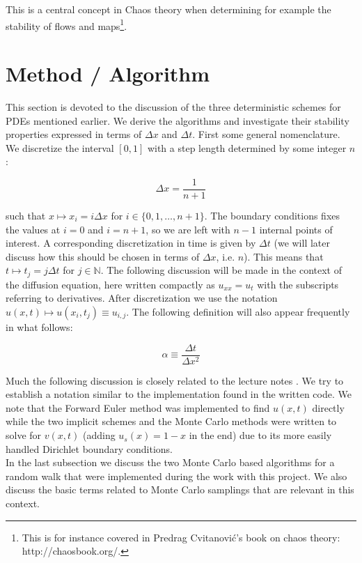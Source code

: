 \documentclass[a4paper, 11pt, notitlepage,english]{article}
\begin{document}
This is a central concept in Chaos theory when determining for example the stability of flows and maps\footnote{This is for instance covered in Predrag Cvitanović's book on chaos theory: http://chaosbook.org/.}.

\section{Method / Algorithm}
This section is devoted to the discussion of the three deterministic schemes for PDEs mentioned earlier. We derive the algorithms and investigate their stability properties expressed in terms of $\Delta x$ and $\Delta t$. First some general nomenclature. We discretize the interval $[0,1]$ with a step length determined by some integer $n$: 

\begin{equation}
 \Delta x = \frac{1}{n+1}
\label{eq:Step_length}
\end{equation}

such that $x \mapsto x_i = i\Delta x$ for $i \in \{0,1,\dots,n+1 \}$. The boundary conditions fixes the values at $i=0$ and $i=n+1$, so we are left with $n-1$ internal points
of interest. A corresponding discretization in time is given by $\Delta t$ (we will later discuss how this should be chosen in terms of $\Delta x$, i.e. $n$).
This means that $t\mapsto t_j = j\Delta t$ for $j\in \mathbb{N}$. The following discussion will be made in the context of the diffusion equation, here written compactly
as $u_{xx} = u_t$ with the subscripts referring to derivatives. After discretization we use the notation $u(x,t) \mapsto u(x_i, t_j) \equiv u_{i,j}$. The following definition 
will also appear frequently in what follows:

\begin{equation}
 \alpha \equiv \frac{\Delta t}{\Delta x^2}
\label{eq:Step_parameter}
\end{equation}

Much the following discussion is closely related to the lecture notes \cite{Komp3150}. We try to establish a notation similar to the implementation found in the written code. We note that the Forward Euler method was implemented to find $u(x,t)$ directly while the two implicit schemes and the Monte Carlo methods were written to solve for $v(x,t)$ (adding $u_s(x) = 1-x$ in the end) due to its more easily handled Dirichlet boundary conditions. \\

In the last subsection we discuss the two Monte Carlo based algorithms for a random walk that were implemented during the work with this project. We also discuss the basic terms related to Monte Carlo samplings that are relevant in this context.
\end{document}
